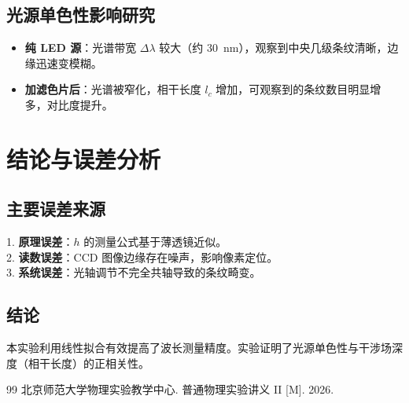 \documentclass[10pt,twocolumn,a4paper]{article}
\begin{document}
	\subsection{光源单色性影响研究}
	\begin{itemize}
		\item \textbf{纯 LED 源}：光谱带宽 $\Delta \lambda$ 较大（约 \SI{30}{nm}），观察到中央几级条纹清晰，边缘迅速变模糊。
		\item \textbf{加滤色片后}：光谱被窄化，相干长度 $l_c$ 增加，可观察到的条纹数目明显增多，对比度提升。
	\end{itemize}
	
	\section{结论与误差分析}
	\subsection{主要误差来源}
	1. \textbf{原理误差}：$h$ 的测量公式基于薄透镜近似。\\
	2. \textbf{读数误差}：CCD 图像边缘存在噪声，影响像素定位。\\
	3. \textbf{系统误差}：光轴调节不完全共轴导致的条纹畸变。
	
	\subsection{结论}
	本实验利用线性拟合有效提高了波长测量精度。实验证明了光源单色性与干涉场深度（相干长度）的正相关性。
	
	\begin{thebibliography}{99}
		 北京师范大学物理实验教学中心. 普通物理实验讲义 II [M]. 2026.
	\end{thebibliography}
	
\end{document}
